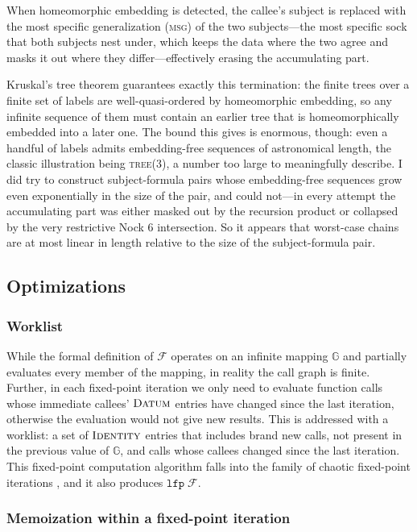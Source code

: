 \documentclass[twoside]{article}
\begin{document}
When homeomorphic embedding is detected, the callee's subject is replaced with the most specific generalization (\textsc{msg}) of the two subjects---the most specific sock that both subjects nest under, which keeps the data where the two agree and masks it out where they differ---effectively erasing the accumulating part.

Kruskal's tree theorem \citep{kruskal-tree} guarantees exactly this termination: the finite trees over a finite set of labels are well-quasi-ordered by homeomorphic embedding, so any infinite sequence of them must contain an earlier tree that is homeomorphically embedded into a later one. The bound this gives is enormous, though: even a handful of labels admits embedding-free sequences of astronomical length, the classic illustration being \textsc{tree(3)}, a number too large to meaningfully describe. I did try to construct subject-formula pairs whose embedding-free sequences grow even exponentially in the size of the pair, and could not---in every attempt the accumulating part was either masked out by the recursion product or collapsed by the very restrictive Nock 6 intersection. So it appears that worst-case chains are at most linear in length relative to the size of the subject-formula pair.

\subsection{Optimizations}

\subsubsection{Worklist}

While the formal definition of $\mathcal{F}$ operates on an infinite mapping $\mathbb{G}$ and partially evaluates every member of the mapping, in reality the call graph is finite. Further, in each fixed-point iteration we only need to evaluate function calls whose immediate callees' $\textsc{Datum}$ entries have changed since the last iteration, otherwise the evaluation would not give new results. This is addressed with a worklist: a set of $\textsc{Identity}$ entries that includes brand new calls, not present in the previous value of $\mathbb{G}$, and calls whose callees changed since the last iteration. This fixed-point computation algorithm falls into the family of chaotic fixed-point iterations \citep{chaos-iter}, and it also produces $\mathtt{lfp}\;\mathcal{F}$.

\subsubsection{Memoization within a fixed-point iteration}
\end{document}

